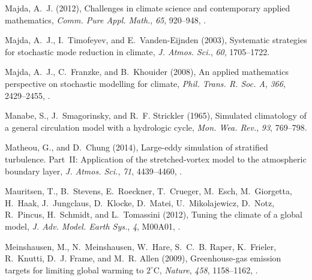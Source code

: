\documentclass[draft]{agujournal}
\begin{document}
\begin{thebibliography}{196}
Majda, A.~J. (2012), Challenges in climate science and contemporary applied
  mathematics, \textit{Comm. Pure Appl. Math.}, \textit{65}, 920--948,
  .

Majda, A.~J., I.~Timofeyev, and E.~Vanden-Eijnden (2003), Systematic strategies
  for stochastic mode reduction in climate, \textit{J. Atmos. Sci.},
  \textit{60}, 1705--1722.

Majda, A.~J., C.~Franzke, and B.~Khouider (2008), An applied mathematics
  perspective on stochastic modelling for climate, \textit{Phil. Trans. R. Soc.
  A}, \textit{366}, 2429--2455, .

Manabe, S., J.~Smagorinsky, and R.~F. Strickler (1965), Simulated climatology
  of a general circulation model with a hydrologic cycle, \textit{Mon. Wea.
  Rev.}, \textit{93}, 769--798.

Matheou, G., and D.~Chung (2014), Large-eddy simulation of stratified
  turbulence. {Part~II}: Application of the stretched-vortex model to the
  atmospheric boundary layer, \textit{J. Atmos. Sci.}, \textit{71}, 4439--4460,
  .

Mauritsen, T., B.~Stevens, E.~Roeckner, T.~Crueger, M.~Esch, M.~Giorgetta,
  H.~Haak, J.~Jungclaus, D.~Klocke, D.~Matei, U.~Mikolajewicz, D.~Notz,
  R.~Pincus, H.~Schmidt, and L.~Tomassini (2012), Tuning the climate of a
  global model, \textit{J. Adv. Model. Earth Sys.}, \textit{4}, M00A01,
  .

Meinshausen, M., N.~Meinshausen, W.~Hare, S.~C.~B. Raper, K.~Frieler,
  R.~Knutti, D.~J. Frame, and M.~R. Allen (2009), Greenhouse-gas emission
  targets for limiting global warming to {$2^\circ$C}, \textit{Nature},
  \textit{458}, 1158--1162, .


\end{thebibliography}
\end{document}
